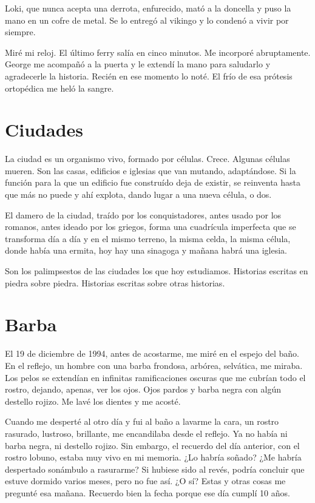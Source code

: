 \documentclass[11pt,twoside,openright,a6paper]{book}
\begin{document}
Loki, que nunca acepta una derrota, enfurecido, mató a la doncella y puso la mano en un cofre de metal. Se lo entregó al vikingo y lo condenó a vivir por siempre.

Miré mi reloj. El último ferry salía en cinco minutos. Me incorporé abruptamente. George me acompañó a la puerta y le extendí la mano para saludarlo y agradecerle la historia. Recién en ese momento lo noté. El frío de esa prótesis ortopédica me heló la sangre.

\chapter*{Ciudades}

La ciudad es un organismo vivo, formado por células. Crece. Algunas células mueren. Son las casas, edificios e iglesias que van mutando, adaptándose. Si la función para la que un edificio fue construído deja de existir, se reinventa hasta que más no puede y ahí explota, dando lugar a una nueva célula, o dos.

El damero de la ciudad, traído por los conquistadores, antes usado por los romanos, antes ideado por los griegos, forma una cuadrícula imperfecta que se transforma día a día y en el mismo terreno, la misma celda, la misma célula, donde había una ermita, hoy hay una sinagoga y mañana habrá una iglesia.

Son los palimpsestos de las ciudades los que hoy estudiamos. Historias escritas en piedra sobre piedra. Historias escritas sobre otras historias.


\chapter*{Barba}

El 19 de diciembre de 1994, antes de acostarme, me miré en el espejo del baño. En el reflejo, un hombre con una barba frondosa, arbórea, selvática, me miraba. Los pelos se extendían en infinitas ramificaciones oscuras que me cubrían todo el rostro, dejando, apenas, ver los ojos. Ojos pardos y barba negra con algún destello rojizo. Me lavé los dientes y me acosté.

Cuando me desperté al otro día y fui al baño a lavarme la cara, un rostro rasurado, lustroso, brillante, me encandilaba desde el reflejo. Ya no había ni barba negra, ni destello rojizo. Sin embargo, el recuerdo del día anterior, con el rostro lobuno, estaba muy vivo en mi memoria. ¿Lo habría soñado? ¿Me habría despertado sonámbulo a rasurarme? Si hubiese sido al revés, podría concluir que estuve dormido varios meses, pero no fue así. ¿O sí? Estas y otras cosas me pregunté esa mañana. Recuerdo bien la fecha porque ese día cumplí 10 años.
\end{document}
